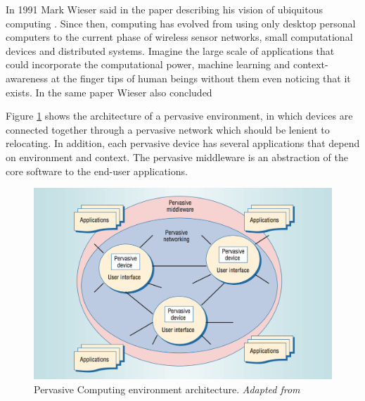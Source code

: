 In 1991 Mark Wieser said in the paper describing his vision of ubiquitous computing   \cite{weiser1991ubicomp}. Since then, computing has evolved from using only desktop personal computers to the current phase of wireless sensor networks, small computational devices and distributed systems. Imagine the large scale of applications that could incorporate the computational power, machine learning and context-awareness at the finger tips of  human beings without them even noticing that it exists. In the same paper Wieser also concluded  



Figure \ref{fig:pervaisive-computing} shows the architecture of a pervasive environment, in which devices are connected together through a pervasive network which should be lenient to relocating. In addition, each pervasive device has several applications that depend on environment and  context. The pervasive middleware is an abstraction of the core software to the end-user applications.

\begin{figure}[H]
	\centering
	\includegraphics[scale=0.7]{images/pervasive-computing.png}
	\caption{Pervasive Computing environment architecture. \textit{Adapted from \cite{Saha:2003:PCP:642243.642248}}}
 	\label{fig:pervaisive-computing}
\end{figure}


